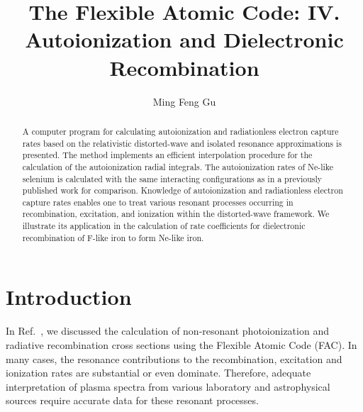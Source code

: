\documentclass[preprint, floatfix, pra, showpacs, showkeys]{revtex4}
\begin{document}
\title{The Flexible Atomic Code: IV. Autoionization and Dielectronic
Recombination}  
\author{Ming Feng Gu}

\begin{abstract} 
A computer program for calculating autoionization and radiationless electron
capture rates based on the relativistic distorted-wave and
isolated resonance approximations is presented. The method implements an
efficient 
interpolation procedure for the calculation of the autoionization radial
integrals. The 
autoionization rates of Ne-like selenium is calculated with the same
interacting configurations as in a previously published work for
comparison. Knowledge of autoionization and
radiationless electron capture rates enables one to treat various resonant
processes occurring in recombination, excitation, and ionization within
the distorted-wave framework. We illustrate its application in the calculation
of rate coefficients for dielectronic recombination of F-like iron to form
Ne-like iron. 
\end{abstract}

\maketitle

\section{Introduction}
In Ref.~\cite{gu02c}, we discussed
the calculation of non-resonant photoionization and radiative recombination
cross sections
using the Flexible Atomic Code (FAC). In many cases, the resonance
contributions to the recombination, excitation and ionization rates are
substantial or even dominate. Therefore, adequate interpretation of plasma
spectra from various laboratory and astrophysical sources require accurate
data for these resonant processes. 
\end{document}
